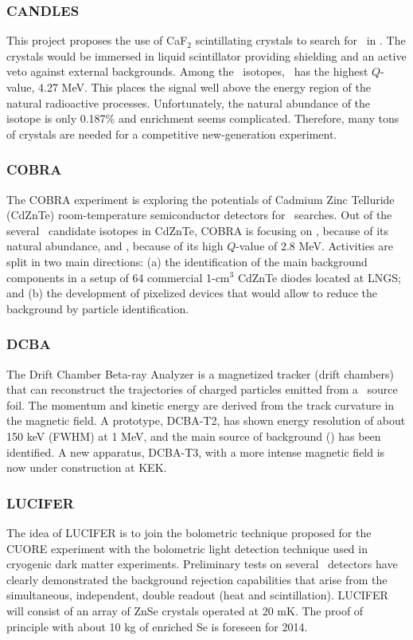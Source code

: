 \subsubsection*{CANDLES} This project \cite{Umehara:2010zz} proposes the use of CaF$_{2}$ scintillating crystals to search for \bbonu\ in \CA. The crystals would be immersed in liquid scintillator providing shielding and an active veto against external backgrounds. Among the \bb\ isotopes, \CA\ has the highest $Q$-value, 4.27 MeV. This places the signal well above the energy region of the natural radioactive processes. Unfortunately, the natural abundance of the isotope is only 0.187\% and enrichment seems complicated. Therefore, many tons of crystals are needed for a competitive new-generation experiment.  
%
\subsubsection*{COBRA} The COBRA experiment \cite{Zuber:2001vm, Zuber:2010zz} is exploring the potentials of Cadmium Zinc Telluride (CdZnTe) room-temperature semiconductor detectors for \bbonu\ searches. Out of the several \bb\ candidate isotopes in CdZnTe, COBRA is focusing on \TE, because of its natural abundance, and \CD, because of its high $Q$-value of 2.8 MeV. Activities are split in two main directions: (a) the identification of the main background components in a setup of 64 commercial 1-cm$^{3}$ CdZnTe diodes located at LNGS; and (b) the development of pixelized devices that would allow to reduce the background by particle identification.
%
\subsubsection*{DCBA} The Drift Chamber Beta-ray Analyzer \cite{Ishikawa:2011zza} is a magnetized tracker (drift chambers) that can reconstruct the trajectories of charged particles emitted from a \bb\ source foil. The momentum and kinetic energy are derived from the track curvature in the magnetic field. A prototype, DCBA-T2, has shown energy resolution of about 150 keV (FWHM) at 1 MeV, and the main source of background (\BI) has been identified. A new apparatus, DCBA-T3, with a more intense magnetic field is now under construction at KEK.
%
\subsubsection*{LUCIFER} The idea of LUCIFER \cite{Giuliani:2010zz, Ferroni:2011zz} is to join the bolometric technique proposed for the CUORE experiment with the bolometric light detection technique used in cryogenic dark matter experiments. Preliminary tests on several \bbonu\ detectors have clearly demonstrated the background rejection capabilities that arise from the simultaneous, independent, double readout (heat and scintillation). LUCIFER will consist of an array of ZnSe crystals operated at 20 mK. The proof of principle with about 10 kg of enriched Se is foreseen for 2014.
%
